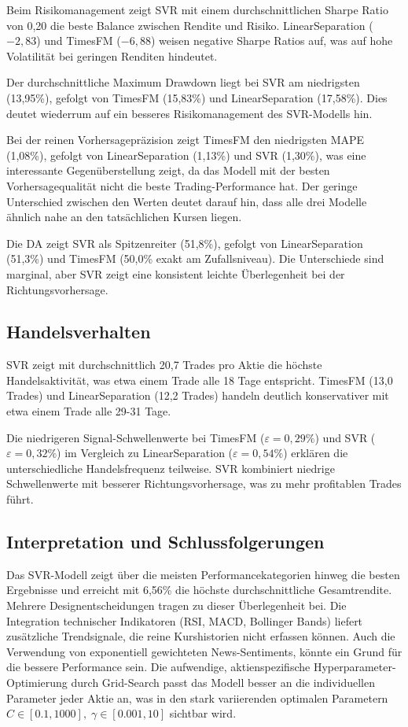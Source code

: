 Beim Risikomanagement zeigt SVR mit einem durchschnittlichen Sharpe Ratio von 0,20 die beste Balance zwischen Rendite und Risiko. LinearSeparation ($-2,83$) und TimesFM ($-6,88$) weisen negative Sharpe Ratios auf, was auf hohe Volatilität bei geringen Renditen hindeutet.

Der durchschnittliche Maximum Drawdown liegt bei SVR am niedrigsten (13,95\%), gefolgt von TimesFM (15,83\%) und LinearSeparation (17,58\%). Dies deutet wiederrum auf ein besseres Risikomanagement des SVR-Modells hin.


Bei der reinen Vorhersagepräzision zeigt TimesFM den niedrigsten \ac{MAPE} (1,08\%), gefolgt von LinearSeparation (1,13\%) und SVR (1,30\%), was eine interessante Gegenüberstellung zeigt, da das Modell mit der besten Vorhersagequalität nicht die beste Trading-Performance hat. Der geringe Unterschied zwischen den Werten deutet darauf hin, dass alle drei Modelle ähnlich nahe an den tatsächlichen Kursen liegen.

Die \ac{DA} zeigt SVR als Spitzenreiter (51,8\%), gefolgt von LinearSeparation (51,3\%) und TimesFM (50,0\% exakt am Zufallsniveau). Die Unterschiede sind marginal, aber SVR zeigt eine konsistent leichte Überlegenheit bei der Richtungsvorhersage.

\subsection{Handelsverhalten}\label{sec:vgl_handelsverhalten}

SVR zeigt mit durchschnittlich 20,7 Trades pro Aktie die höchste Handelsaktivität, was etwa einem Trade alle 18 Tage entspricht. TimesFM (13,0 Trades) und LinearSeparation (12,2 Trades) handeln deutlich konservativer mit etwa einem Trade alle 29-31 Tage.

Die niedrigeren Signal-Schwellenwerte bei TimesFM ($\varepsilon = 0,29\%$) und SVR ($\varepsilon = 0,32\%$) im Vergleich zu LinearSeparation ($\varepsilon = 0,54\%$) erklären die unterschiedliche Handelsfrequenz teilweise. SVR kombiniert niedrige Schwellenwerte mit besserer Richtungsvorhersage, was zu mehr profitablen Trades führt.


\subsection{Interpretation und Schlussfolgerungen}\label{sec:interpretation}

Das SVR-Modell zeigt über die meisten Performancekategorien hinweg die besten Ergebnisse und erreicht mit 6,56\% die höchste durchschnittliche Gesamtrendite. Mehrere Designentscheidungen tragen zu dieser Überlegenheit bei. Die Integration technischer Indikatoren (\ac{RSI}, \ac{MACD}, Bollinger Bands) liefert zusätzliche Trendsignale, die reine Kurshistorien nicht erfassen können. Auch die Verwendung von exponentiell gewichteten News-Sentiments, könnte ein Grund für die bessere Performance sein. Die aufwendige, aktienspezifische Hyperparameter-Optimierung durch Grid-Search passt das Modell besser an die individuellen Parameter jeder Aktie an, was in den stark variierenden optimalen Parametern \( C \in [0.1, 1000], \; \gamma \in [0.001, 10] \) sichtbar wird.

